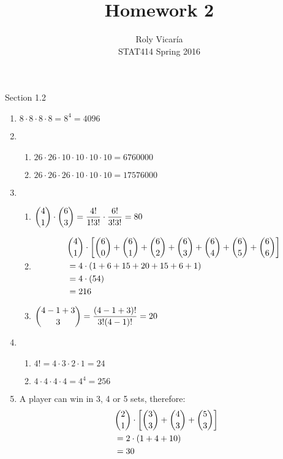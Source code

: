 \documentclass{article}
\title{Homework 2}
\author{Roly Vicar\'ia \\ STAT414 Spring 2016}
\begin{document}
    
    \maketitle
    
    Section 1.2
    \begin{enumerate}
     \item $8\cdot8\cdot8\cdot8 = 8^4 = 4096$
     \addtocounter{enumi}{1}
     
     \item 
      \begin{enumerate}
       \item $26\cdot26\cdot10\cdot10\cdot10\cdot10 = 6760000$
       \item $26\cdot26\cdot26\cdot10\cdot10\cdot10 = 17576000$
      \end{enumerate}

      \item 
	\begin{enumerate}
	 \item $\dbinom{4}{1}\cdot\dbinom{6}{3} = \dfrac{4!}{1!3!}\cdot\dfrac{6!}{3!3!} = 80$
	 \item 
	  \begin{align*}
	    &\dbinom{4}{1}\cdot\left[\dbinom{6}{0}+\dbinom{6}{1}+\dbinom{6}{2}+\dbinom{6}{3}+\dbinom{6}{4}+\dbinom{6}{5}+\dbinom{6}{6}\right] \\
	    &= 4 \cdot (1 + 6 + 15 + 20 + 15 + 6 + 1) \\
	    &= 4 \cdot (54) \\
	    &= 216
	  \end{align*}
	 \item $\dbinom{4-1+3}{3} = \dfrac{(4-1+3)!}{3!(4-1)!} = 20$
	\end{enumerate}

      \item
	\begin{enumerate}
	 \item $4! = 4\cdot3\cdot2\cdot1 = 24$
	 \item $4\cdot4\cdot4\cdot4 = 4^4 = 256$
	\end{enumerate}
      
      \item 
	A player can win in 3, 4 or 5 sets, therefore:
	  \begin{align*}
	    &\dbinom{2}{1} \cdot \left[ \dbinom{3}{3} + \dbinom{4}{3} + \dbinom{5}{3} \right] \\
	    &= 2 \cdot (1 + 4 + 10) \\
	    &= 30
	  \end{align*}
	  

\end{enumerate}
\end{document}
